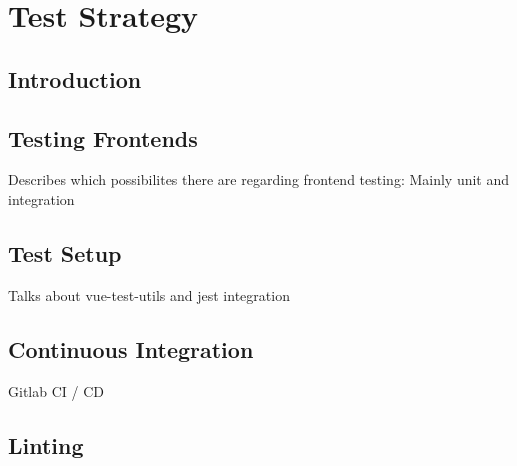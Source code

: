 \chapter[Test Strategy]{Test Strategy}

\section{Introduction}

\section{Testing Frontends}
Describes which possibilites there are regarding frontend testing: Mainly unit and integration

\section{Test Setup}
Talks about vue-test-utils and jest integration

\section{Continuous Integration}
Gitlab CI / CD

\section{Linting}